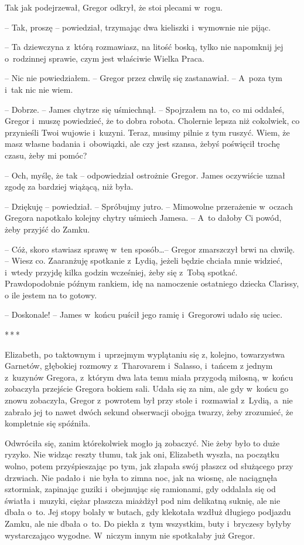 \documentclass[oneside,polish,12pt,sfheadings]{mwbk}
\newcommand{\threeast}{\bigskip\par\centerline{*\,*\,*}\medskip\par}%
\begin{document}
Tak jak podejrzewał, Gregor odkrył, że stoi plecami w~rogu.

-- Tak, proszę -- powiedział, trzymając dwa kieliszki i~wymownie nie
pijąc.

-- Ta dziewczyna z~którą rozmawiasz, na litość boską, tylko nie napomknij
jej o~rodzinnej sprawie, czym jest właściwie Wielka Praca.

-- Nic nie powiedziałem. -- Gregor przez chwilę się zastanawiał. -- A~poza
tym i~tak nic nie wiem.

-- Dobrze. -- James chytrze się uśmiechnął. -- Spojrzałem na to, co mi
oddałeś, Gregor i~muszę powiedzieć, że to dobra robota. Cholernie lepsza
niż cokolwiek, co przynieśli Twoi wujowie i~kuzyni. Teraz, musimy pilnie
z tym ruszyć. Wiem, że masz własne badania i~obowiązki, ale czy jest
szansa, żebyś poświęcił trochę czasu, żeby mi pomóc?

-- Och, myślę, że tak -- odpowiedział ostrożnie Gregor. James oczywiście
uznał zgodę za bardziej wiążącą, niż była.

-- Dziękuję -- powiedział. -- Spróbujmy jutro. -- Mimowolne przerażenie w~oczach Gregora napotkało kolejny chytry uśmiech Jamesa. -- A~to dałoby Ci
powód, żeby przyjść do Zamku.

-- Cóż, skoro stawiasz sprawę w~ten sposób\ldots -- Gregor zmarszczył brwi
na chwilę. -- Wiesz co. Zaaranżuję spotkanie z~Lydią, jeżeli będzie
chciała mnie widzieć, i~wtedy przyjdę kilka godzin wcześniej, żeby się z~Tobą spotkać. Prawdopodobnie późnym rankiem, idę na namoczenie
ostatniego dziecka Clarissy, o ile jestem na to gotowy.

-- Doskonale! -- James w~końcu puścił jego ramię i~Gregorowi udało się
uciec.

\threeast

Elizabeth, po taktownym i~uprzejmym wyplątaniu się z, kolejno,
towarzystwa Garnetów, głębokiej rozmowy z~Tharovarem i~Salasso, i~tańcem
z jednym z~kuzynów Gregora, z~którym dwa lata temu miała przygodą
miłosną, w~końcu zobaczyła przejście Gregora bokiem sali. Udała się za
nim, ale gdy w~końcu go znowu zobaczyła, Gregor z~powrotem był przy
stole i~rozmawiał z~Lydią, a~nie zabrało jej to nawet dwóch sekund
obserwacji obojga twarzy, żeby zrozumieć, że kompletnie się spóźniła.

Odwróciła się, zanim którekolwiek mogło ją zobaczyć. Nie żeby było to
duże ryzyko. Nie widząc reszty tłumu, tak jak oni, Elizabeth wyszła, na
początku wolno, potem przyśpieszając po tym, jak złapała swój płaszcz od
służącego przy drzwiach. Nie padało i~nie była to zimna noc, jak na
wiosnę, ale naciągnęła sztormiak, zapinając guziki i~obejmując się
ramionami, gdy oddalała się od światła i~muzyki, ciężar płaszcza
miażdżył pod nim delikatną suknię, ale nie dbała o~to. Jej stopy bolały
w butach, gdy klekotała wzdłuż długiego podjazdu Zamku, ale nie dbała o~to. Do piekła z~tym wszystkim, buty i~bryczesy byłyby wystarczająco
wygodne. W~niczym innym nie spotkałaby już Gregor.
\end{document}
